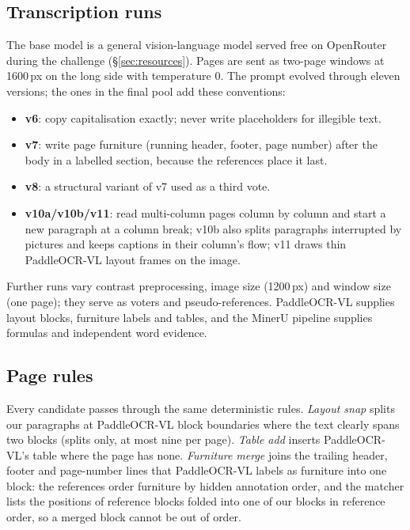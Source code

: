 \documentclass[11pt]{article}
\begin{document}
\subsection{Transcription runs}
The base model is a general vision-language model served free on OpenRouter during the challenge (\S\ref{sec:resources}). Pages are sent as two-page windows at 1600\,px on the long side with temperature 0. The prompt evolved through eleven versions; the ones in the final pool add these conventions:
\begin{itemize}
  \setlength\itemsep{0pt}
  \item \textbf{v6}: copy capitalisation exactly; never write placeholders for illegible text.
  \item \textbf{v7}: write page furniture (running header, footer, page number) after the body in a labelled section, because the references place it last.
  \item \textbf{v8}: a structural variant of v7 used as a third vote.
  \item \textbf{v10a/v10b/v11}: read multi-column pages column by column and start a new paragraph at a column break; v10b also splits paragraphs interrupted by pictures and keeps captions in their column's flow; v11 draws thin PaddleOCR-VL layout frames on the image.
\end{itemize}
Further runs vary contrast preprocessing, image size (1200\,px) and window size (one page); they serve as voters and pseudo-references. PaddleOCR-VL \citep{paddleocrvl} supplies layout blocks, furniture labels and tables, and the MinerU pipeline \citep{mineru} supplies formulas and independent word evidence.

\subsection{Page rules}
Every candidate passes through the same deterministic rules. \emph{Layout snap} splits our paragraphs at PaddleOCR-VL block boundaries where the text clearly spans two blocks (splits only, at most nine per page). \emph{Table add} inserts PaddleOCR-VL's table where the page has none. \emph{Furniture merge} joins the trailing header, footer and page-number lines that PaddleOCR-VL labels as furniture into one block: the references order furniture by hidden annotation order, and the matcher lists the positions of reference blocks folded into one of our blocks in reference order, so a merged block cannot be out of order.
\end{document}
